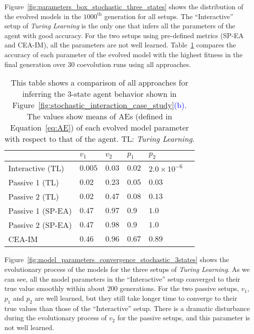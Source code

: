 Figure~\ref{fig:parameters_box_stochastic_three_states} shows the distribution of the evolved models in the $1000^\mathrm{th}$ generation for all setups. The ``Interactive'' setup of \textit{Turing Learning} is the only one that infers all the parameters of the agent with good accuracy. For the two setups using pre-defined metrics (SP-EA and CEA-IM), all the parameters are not well learned. Table~\ref{table:relative_accuracy_stochastic_3states} compares the accuracy of each parameter of the evolved model with the highest fitness in the final generation over $30$ coevolution runs using all approaches.

\begin{table}[!t] 
\caption{This table shows a comparison of all approaches for inferring the 3-state agent behavior shown in Figure~\ref{fig:stochastic_interaction_case_study}\textcolor{blue}{(b)}. The values show means of AEs (defined in Equation~\ref{eq:AE}) of each evolved model parameter with respect to that of the agent. TL: \textit{Turing Learning}.} 
\renewcommand{\arraystretch}{1.1}
\centering %
\begin{tabular}{l l l l l l} %
\hline\hline  %
 & $v_1$ & $v_2$ & $p_1$ & $p_2$ &  \\  
\hline   %
Interactive (TL) & $0.005$ & $0.03$ & $0.02$ & $2.0\times10^{-6}$ \\ %
Passive 1 (TL) & $0.02$ & $0.23$ & $0.05$ & $0.03$\\ 
Passive 2 (TL) & $0.02$ & $0.47$ & $0.08$ & $0.13$\\ 
Passive 1 (SP-EA) & $0.47$ & $0.97$ & $0.9$ & $1.0$\\ 
Passive 2 (SP-EA) & $0.47$ & $0.98$ & $0.9$ & $1.0$\\ 
CEA-IM & $0.46$ & $0.96$ & $0.67$ & $0.89$\\
\hline %
\end{tabular} 
\label{table:relative_accuracy_stochastic_3states} 
\end{table} 

Figure~\ref{fig:model_parameters_convergence_stochastic_3states} shows the evolutionary process of the models for the three setups of \textit{Turing Learning}. As we can see, all the model parameters in the ``Interactive'' setup converged to their true value smoothly within about $200$ generations. For the two passive setups, $v_1$, $p_1$ and $p_2$ are well learned, but they still take longer time to converge to their true values than those of the ``Interactive'' setup. There is a dramatic disturbance during the evolutionary process of $v_2$ for the passive setups, and this parameter is not well learned.

